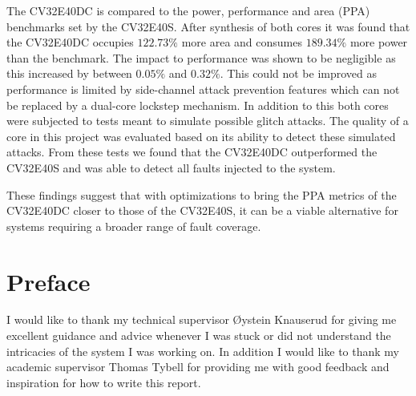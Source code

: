 The CV32E40DC is compared to the power, performance and area (PPA) benchmarks set by the CV32E40S. After synthesis of both cores it was found that the CV32E40DC occupies $122.73\%$ more area and consumes $189.34\%$ more power than the benchmark. The impact to performance was shown to be negligible as this increased by between $0.05\%$ and $0.32\%$. This could not be improved as performance is limited by side-channel attack prevention features which can not be replaced by a dual-core lockstep mechanism. In addition to this both cores were subjected to tests meant to simulate possible glitch attacks. The quality of a core in this project was evaluated based on its ability to detect these simulated attacks. From these tests we found that the CV32E40DC outperformed the CV32E40S and was able to detect all faults injected to the system. 

These findings suggest that with optimizations to bring the PPA metrics of the CV32E40DC closer to those of the CV32E40S, it can be a viable alternative for systems requiring a broader range of fault coverage. 


\chapter{Preface}

I would like to thank my technical supervisor Øystein Knauserud for giving me excellent guidance and advice whenever I was stuck or did not understand the intricacies of the system I was working on. In addition I would like to thank my academic supervisor Thomas Tybell for providing me with good feedback and inspiration for how to write this report. 

